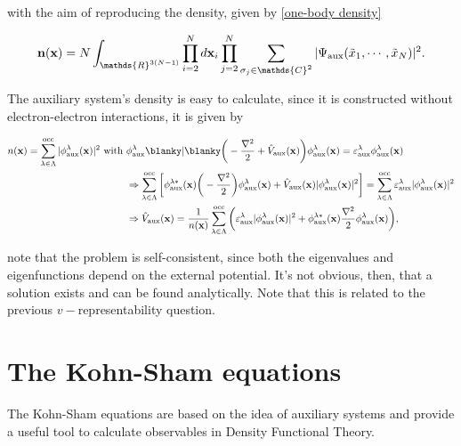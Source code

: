 \documentclass{homework}
\begin{document}
with the aim of reproducing the density, given by \eqref{one-body density}

\begin{equation}
{\bf n}({\bf x}) = N \int_{\mathds{R}^{3(N-1)}} \prod_{i=2}^N d{\bf x}_i \prod_{j=2}^{N} \sum_{\sigma_j \in \mathds{C}^2} |\Psi_{\textnormal{aux}}(\tilde{x}_1, \cdots, \tilde{x}_N) |^{2}.
\end{equation}

The auxiliary system's density is easy to calculate, since it is constructed without electron-electron interactions, it is given by 

\begin{align*}
    n({\bf x}) = \sum_{\lambda \in \Lambda}^{\textnormal{occ}} |\phi_{\textnormal{aux}}^{\lambda}({\bf x}) |^2 \textnormal{ with } & \phi_{\textnormal{aux}}^{\lambda} \blanky | \blanky \bigg(- \frac{\nabla^2}{2} + \hat{V}_{\textnormal{aux}}({\bf x}) \bigg) \phi_{\textnormal{aux}}^{\lambda}({\bf x}) = \varepsilon_{\textnormal{aux}}^{\lambda}\phi_{\textnormal{aux}}^{\lambda}({\bf x}) \\
&\Rightarrow \sum_{\lambda \in \Lambda}^{\textnormal{occ}} \bigg[\phi_{\textnormal{aux}}^{\lambda*}({\bf x}) \bigg(-\frac{\nabla^2}{2}\bigg)\phi_{\textnormal{aux}}^{\lambda}({\bf x}) + \hat{V}_{\textnormal{aux}}({\bf x}) |\phi_{\textnormal{aux}}^{\lambda}({\bf x})|^2\bigg] = \sum_{\lambda \in \Lambda}^{\textnormal{occ}} \varepsilon_{\textnormal{aux}}^{\lambda}|\phi_{\textnormal{aux}}^{\lambda}({\bf x})|^2 \\
&\Rightarrow \hat{V}_{\textnormal{aux}}({\bf x}) = \frac{1}{ n({\bf x})} \sum_{\lambda \in \Lambda}^{\textnormal{occ}} \bigg(\varepsilon_{\textnormal{aux}}^{\lambda}|\phi_{\textnormal{aux}}^{\lambda}({\bf x})|^2 + \phi_{\textnormal{aux}}^{\lambda*}({\bf x}) \frac{\nabla^2}{2}\phi_{\textnormal{aux}}^{\lambda}({\bf x}) \bigg),
\end{align*}

note that the problem is self-consistent, since both the eigenvalues and eigenfunctions depend on the external potential. It's not obvious, then, that a solution exists and can be found analytically. Note that this is related to the previous $v-$representability question. 

\section{The Kohn-Sham equations}

The Kohn-Sham equations are based on the idea of auxiliary systems and provide a useful tool to calculate observables in Density Functional Theory. 
\end{document}

